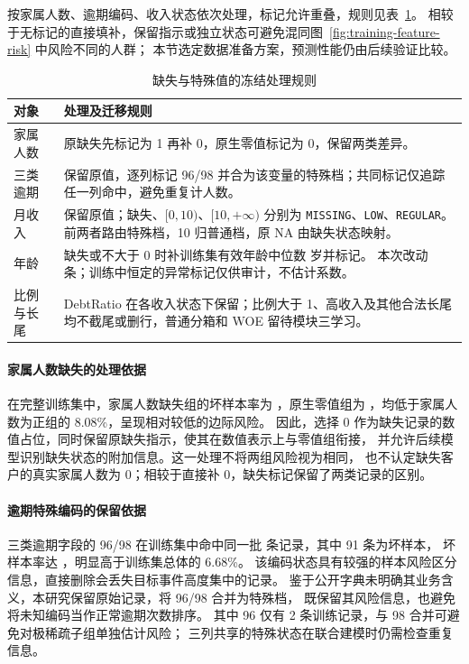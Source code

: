 

按家属人数、逾期编码、收入状态依次处理，标记允许重叠，规则见表~\ref{tab:cleaning-rules}。
相较于无标记的直接填补，保留指示或独立状态可避免混同图~\ref{fig:training-feature-risk} 中风险不同的人群；
本节选定数据准备方案，预测性能仍由后续验证比较。

\begin{table}[!htbp]
  \centering
  \caption{缺失与特殊值的冻结处理规则}
  \label{tab:cleaning-rules}
  \footnotesize
  \setlength{\tabcolsep}{3pt}
  \renewcommand{\arraystretch}{1.04}
  \begin{tabular}{p{2.0cm}p{13.1cm}}
    \toprule
    对象 & 处理及迁移规则 \\
    \midrule
    家属人数 & 原缺失先标记为 1 再补 0，原生零值标记为 0，保留两类差异。 \\
    三类逾期 & 保留原值，逐列标记 96/98 并合为该变量的特殊档；共同标记仅追踪任一列命中，避免重复计人数。 \\
    月收入 & 保留原值；缺失、$[0,10)$、$[10,+\infty)$ 分别为 \texttt{MISSING}、\texttt{LOW}、\texttt{REGULAR}。
    前两者路由特殊档，10 归普通档，原 NA 由缺失状态映射。 \\
    年龄 & 缺失或不大于 0 时补训练集有效年龄中位数 \PreprocessAgeMedian{} 岁并标记。
    本次改动 \PreprocessAgeChanged{} 条；训练中恒定的异常标记仅供审计，不估计系数。 \\
    比例与长尾 & DebtRatio 在各收入状态下保留；比例大于 1、高收入及其他合法长尾均不截尾或删行，普通分箱和 WOE 留待模块三学习。 \\
    \bottomrule
  \end{tabular}
\end{table}

\begin{samepage}
\paragraph{家属人数缺失的处理依据}
在完整训练集中，家属人数缺失组的坏样本率为 \DependentsMissingRisk，原生零值组为
\DependentsZeroRisk，均低于家属人数为正组的 8.08\%，呈现相对较低的边际风险。
因此，选择 0 作为缺失记录的数值占位，同时保留原缺失指示，使其在数值表示上与零值组衔接，
并允许后续模型识别缺失状态的附加信息。这一处理不将两组风险视为相同，
也不认定缺失客户的真实家属人数为 0；相较于直接补 0，缺失标记保留了两类记录的区别。\par
\end{samepage}

\paragraph{逾期特殊编码的保留依据}
三类逾期字段的 96/98 在训练集中命中同一批 \LateSpecialN{} 条记录，其中 91 条为坏样本，
坏样本率达 \LateSpecialRisk，明显高于训练集总体的 6.68\%。
该编码状态具有较强的样本风险区分信息，直接删除会丢失目标事件高度集中的记录。
鉴于公开字典未明确其业务含义，本研究保留原始记录，将 96/98 合并为特殊档，
既保留其风险信息，也避免将未知编码当作正常逾期次数排序。
其中 96 仅有 2 条训练记录，与 98 合并可避免对极稀疏子组单独估计风险；
三列共享的特殊状态在联合建模时仍需检查重复信息。
